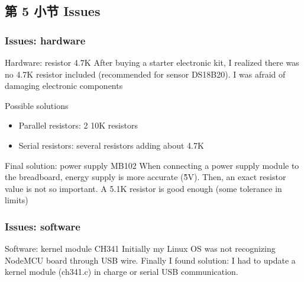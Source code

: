 \documentclass[
    aspectratio=169,                   %
]{beamer}
\begin{document}
\subsection{第 5 小节 Issues}

    \begin{frame}
        \frametitle{Issues: hardware}

        \begin{block}{Hardware: resistor 4.7K}
            After buying a starter electronic kit, I realized there was no 4.7K resistor included (recommended for sensor DS18B20). I was afraid of damaging electronic components
        \end{block}

        \begin{block}{Possible solutions}
            \begin{itemize}
                \item \alert{Parallel resistors}: 2 10K resistors
                \item \alert{Serial resistors}: several resistors adding about 4.7K
            \end{itemize}
        \end{block}

        \begin{block}{Final solution: power supply MB102}
            When connecting a power supply module to the breadboard, energy supply is more accurate (\~5V). Then, an exact resistor value is not so important. A 5.1K resistor is good enough (some tolerance in limits)
        \end{block}



    \end{frame}

    \begin{frame}
        \frametitle{Issues: software}

        \begin{block}{Software: kernel module CH341}
            Initially my Linux OS was not recognizing NodeMCU board through USB wire. Finally I found solution\cite{ch341}: I had to update a kernel module \alert{(ch341.c)} in charge or serial USB communication.
        \end{block}

        
    \end{frame}
\end{document}
